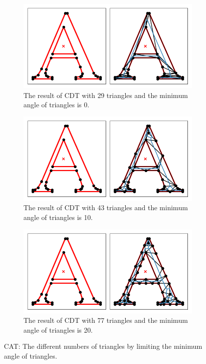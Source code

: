 \documentclass[]{article}
\begin{document}
\begin{figure}[ht]
    \centering
    \begin{subfigure}{0.30\textwidth}
        \centering
        \includegraphics[width=1\linewidth]{cdt1_29.png}
        \caption{The result of CDT with 29 triangles and the minimum angle of triangles is 0.}
        \label{fig:cdt1}
    \end{subfigure}
    \hfill  %
    \begin{subfigure}{0.30\textwidth}
        \centering
        \includegraphics[width=\linewidth]{cdt2_43.png}
        \caption{The result of CDT with 43 triangles and the minimum angle of triangles is 10.}
        \label{fig:cdt2}
    \end{subfigure}
    \hfill  %
    \begin{subfigure}{0.30\textwidth}
        \centering
        \includegraphics[width=\linewidth]{cdt3_77.png}
        \caption{The result of CDT with 77 triangles and the minimum angle of triangles is 20.}
        \label{fig:cdt3}
    \end{subfigure}
    \caption{
        CAT: The different numbers of triangles by limiting the minimum angle of triangles.
    }
    \label{fig:q3cdt}
\end{figure}
\end{document}
